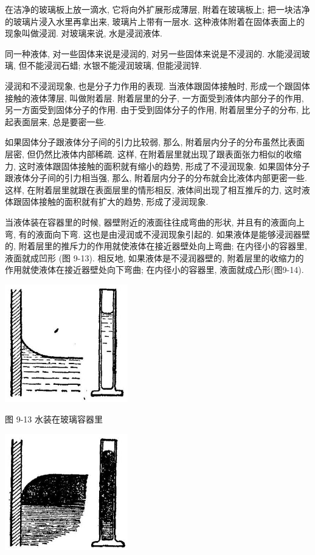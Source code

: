 \documentclass[10pt]{article}
\begin{document}
在洁净的玻璃板上放一滴水, 它将向外扩展形成薄层, 附着在玻璃板上; 把一块洁净的玻璃片浸入水里再拿出来, 玻璃片上带有一层水. 这种液体附着在固体表面上的现象叫做浸润. 对玻璃来说, 水是浸润液体.

同一种液体, 对一些固体来说是浸润的, 对另一些固体来说是不浸润的. 水能浸润玻璃, 但不能浸润石蜡; 水银不能浸润玻璃, 但能浸润锌.

浸润和不浸润现象, 也是分子力作用的表现. 当液体跟固体接触时, 形成一个跟固体接触的液体薄层, 叫做附着层. 附着层里的分子, 一方面受到液体内部分子的作用, 另一方面受到固体分子的作用. 由于受到固体分子的作用, 附着层里分子的分布, 比起表面层来, 总是要密一些.

如果固体分子跟液体分子间的引力比较弱, 那么, 附着层内分子的分布虽然比表面层密, 但仍然比液体内部稀疏. 这样, 在附着层里就出现了跟表面张力相似的收缩力, 这时液体跟固体接触的面积就有缩小的趋势, 形成了不浸润现象. 如果固体分子跟液体分子间的引力相当强, 那么, 附着层内分子的分布就会比液体内部更密一些. 这样, 在附着层里就跟在表面层里的情形相反, 液体间出现了相互推斥的力, 这时液体跟固体接触的面积就有扩大的趋势, 形成了浸润现象.

当液体装在容器里的时候, 器壁附近的液面往往成弯曲的形状, 并且有的液面向上弯, 有的液面向下弯. 这也是由浸润或不浸润现象引起的. 如果液体是能够浸润器壁的, 附着层里的推斥力的作用就使液体在接近器壁处向上弯曲; 在内径小的容器里, 液面就成凹形 (图 9-13). 相反地, 如果液体是不浸润器壁的, 附着层里的收缩力的作用就使液体在接近器壁处向下弯曲; 在内径小的容器里, 液面就成凸形(图9-14).

\begin{center}
\includegraphics[max width=0.4\textwidth]{images/01912d55-147c-70aa-b0e0-1782a122f948_269_872208.jpg}
\end{center}

图 9-13 水装在玻璃容器里

\begin{center}
\includegraphics[max width=0.4\textwidth]{images/01912d55-147c-70aa-b0e0-1782a122f948_269_456946.jpg}
\end{center}
\end{document}
